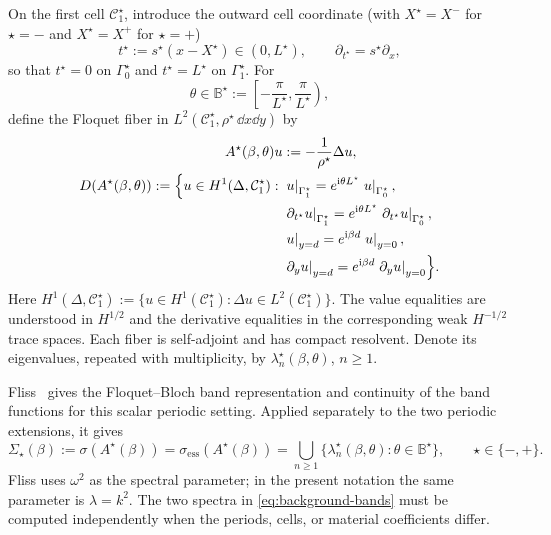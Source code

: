 On the first cell $\mathcal C_1^\star$, introduce the outward cell coordinate
(with $X^\star=X^-$ for $\star=-$ and $X^\star=X^+$ for $\star=+$)
\[
  t^\star:=s^\star(x-X^\star)\in(0,L^\star),
  \qquad \partial_{t^\star}=s^\star\partial_x,
\]
so that $t^\star=0$ on $\Gamma_0^\star$ and $t^\star=L^\star$ on
$\Gamma_1^\star$.  For
\[
  \theta\in\mathbb B^\star
  :=\left[-\frac{\pi}{L^\star},\frac{\pi}{L^\star}\right),
\]
define the Floquet fiber in
$L^2(\mathcal C_1^\star,\rho^\star\,\dd x\dd y)$ by
\[
\begin{aligned}
  A^\star(\beta,\theta)u
  &:=-\frac{1}{\rho^\star}\Delta u,\\
  D(A^\star(\beta,\theta))
  :=\Bigl\{u\in H^1(\Delta,\mathcal C_1^\star):{}&
  \left.u\right|_{\Gamma_1^\star}
    =e^{\mathrm{i}\theta L^\star}\left.u\right|_{\Gamma_0^\star},\\
  &\left.\partial_{t^\star}u\right|_{\Gamma_1^\star}
    =e^{\mathrm{i}\theta L^\star}
      \left.\partial_{t^\star}u\right|_{\Gamma_0^\star},\\
  &\left.u\right|_{y=d}
    =e^{\mathrm{i}\beta d}\left.u\right|_{y=0},\\
  &\left.\partial_yu\right|_{y=d}
    =e^{\mathrm{i}\beta d}\left.\partial_yu\right|_{y=0}
  \Bigr\}.
\end{aligned}
\]
Here
$H^1(\Delta,\mathcal C_1^\star)
:=\{u\in H^1(\mathcal C_1^\star):\Delta u\in
L^2(\mathcal C_1^\star)\}$.  The value equalities are understood in
$H^{1/2}$ and the derivative equalities in the corresponding weak
$H^{-1/2}$ trace spaces.  Each fiber is self-adjoint and has compact
resolvent.  Denote its eigenvalues, repeated with multiplicity, by
$\lambda_n^\star(\beta,\theta)$, $n\geq1$.

Fliss~\cite[Proposition~3.1, especially equations~(3.3)--(3.4)]{Fliss2013}
gives the Floquet--Bloch band representation and continuity of the band
functions for this scalar periodic setting.  Applied separately to the two
periodic extensions, it gives
\begin{equation}
  \Sigma_\star(\beta)
  :=\sigma(A^\star(\beta))
  =\sigma_{\mathrm{ess}}(A^\star(\beta))
  =\bigcup_{n\geq1}
    \bigl\{\lambda_n^\star(\beta,\theta):
    \theta\in\mathbb B^\star\bigr\},
  \qquad \star\in\{-,+\}.
  \label{eq:background-bands}
\end{equation}
Fliss uses $\omega^2$ as the spectral parameter; in the present notation the
same parameter is $\lambda=k^2$.  The two spectra in
\eqref{eq:background-bands} must be computed independently when the periods,
cells, or material coefficients differ.

